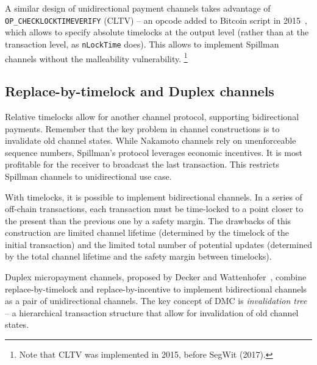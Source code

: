 A similar design of unidirectional payment channels takes advantage of \texttt{OP\_CHECKLOCKTIMEVERIFY} (CLTV) -- an opcode added to Bitcoin script in 2015~\cite{Todd2014}, which allows to specify absolute timelocks at the output level (rather than at the transaction level, as \texttt{nLockTime} does).
This allows to implement Spillman channels without the malleability vulnerability.
\footnote{Note that CLTV was implemented in 2015, before SegWit (2017).}


\subsection{Replace-by-timelock and Duplex channels}

Relative timelocks allow for another channel protocol, supporting bidirectional payments.
Remember that the key problem in channel constructions is to invalidate old channel states.
While Nakamoto channels rely on unenforceable sequence numbers, Spillman's protocol leverages economic incentives.
It is most profitable for the receiver to broadcast the last transaction.
This restricts Spillman channels to unidirectional use case.

With timelocks, it is possible to implement bidirectional channels.
In a series of off-chain transactions, each transaction must be time-locked to a point closer to the present than the previous one by a safety margin.
The drawbacks of this construction are limited channel lifetime (determined by the timelock of the initial transaction) and the limited total number of potential updates (determined by the total channel lifetime and the safety margin between timelocks).

Duplex micropayment channels, proposed by Decker and Wattenhofer~\cite{Decker2015}, combine replace-by-timelock and replace-by-incentive to implement bidirectional channels as a pair of unidirectional channels.
The key concept of DMC is \textit{invalidation tree} -- a hierarchical transaction structure that allow for invalidation of old channel states.

